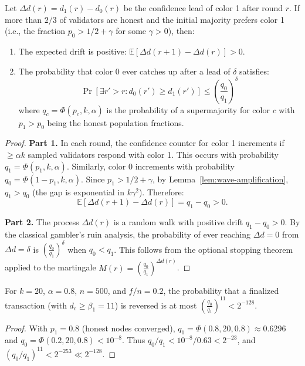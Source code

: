 \begin{theorem}
\label{thm:wave-monotonicity}
Let $\Delta d(r) = d_1(r) - d_0(r)$ be the confidence lead of color 1 after round $r$.
If more than $2/3$ of validators are honest and the initial majority prefers color 1
(i.e., the fraction $p_0 > 1/2 + \gamma$ for some $\gamma > 0$), then:
\begin{enumerate}[nosep]
\item The expected drift is positive: $\mathbb{E}[\Delta d(r+1) - \Delta d(r)] > 0$.
\item The probability that color 0 ever catches up after a lead of $\delta$ satisfies:
\[
\Pr[\exists r' > r : d_0(r') \geq d_1(r')] \leq \left(\frac{q_0}{q_1}\right)^\delta
\]
where $q_c = \Phi(p_c, k, \alpha)$ is the probability of a supermajority for color $c$
with $p_1 > p_0$ being the honest population fractions.
\end{enumerate}
\end{theorem}

\begin{proof}
\textbf{Part 1.} In each round, the confidence counter for color 1 increments if
$\geq \alpha k$ sampled validators respond with color 1. This occurs with probability
$q_1 = \Phi(p_1, k, \alpha)$. Similarly, color 0 increments with probability
$q_0 = \Phi(1 - p_1, k, \alpha)$. Since $p_1 > 1/2 + \gamma$, by Lemma~\ref{lem:wave-amplification},
$q_1 > q_0$ (the gap is exponential in $k\gamma^2$). Therefore:
\[
\mathbb{E}[\Delta d(r+1) - \Delta d(r)] = q_1 - q_0 > 0.
\]

\textbf{Part 2.} The process $\Delta d(r)$ is a random walk with positive drift $q_1 - q_0 > 0$.
By the classical gambler's ruin analysis, the probability of ever reaching $\Delta d = 0$
from $\Delta d = \delta$ is $\left(\frac{q_0}{q_1}\right)^\delta$ when $q_0 < q_1$.
This follows from the optional stopping theorem applied to the martingale
$M(r) = \left(\frac{q_0}{q_1}\right)^{\Delta d(r)}$.
\end{proof}

\begin{corollary}
\label{cor:safety}
For $k = 20$, $\alpha = 0.8$, $n = 500$, and $f/n = 0.2$, the probability that a
finalized transaction (with $d_c \geq \beta_1 = 11$) is reversed is at most
$\left(\frac{q_0}{q_1}\right)^{11} < 2^{-128}$.
\end{corollary}

\begin{proof}
With $p_1 = 0.8$ (honest nodes converged), $q_1 = \Phi(0.8, 20, 0.8) \approx 0.6296$ and
$q_0 = \Phi(0.2, 20, 0.8) < 10^{-8}$. Thus $q_0/q_1 < 10^{-8}/0.63 < 2^{-23}$, and
$(q_0/q_1)^{11} < 2^{-253} \ll 2^{-128}$.
\end{proof}

